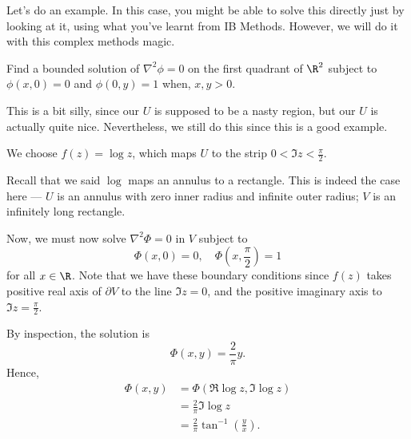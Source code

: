 \documentclass[a4paper]{article}
\begin{document}
Let's do an example. In this case, you might be able to solve this directly just by looking at it, using what you've learnt from IB Methods. However, we will do it with this complex methods magic.
\begin{eg}
  Find a bounded solution of $\nabla^2 \phi = 0$ on the first quadrant of $\R^2$ subject to $\phi(x, 0) = 0$ and $\phi(0, y) = 1$ when, $x, y > 0$.

  This is a bit silly, since our $U$ is supposed to be a nasty region, but our $U$ is actually quite nice. Nevertheless, we still do this since this is a good example.

  We choose $f(z) = \log z$, which maps $U$ to the strip $0 < \Im z < \frac{\pi}{2}$.
  \begin{center}
  \end{center}
  Recall that we said $\log$ maps an annulus to a rectangle. This is indeed the case here --- $U$ is an annulus with zero inner radius and infinite outer radius; $V$ is an infinitely long rectangle.

  Now, we must now solve $\nabla^2 \Phi = 0$ in $V$ subject to
  \[
    \Phi(x, 0) = 0,\quad \Phi\left(x, \frac{\pi}{2}\right) = 1
  \]
  for all $x \in \R$. Note that we have these boundary conditions since $f(z)$ takes positive real axis of $\partial V$ to the line $\Im z = 0$, and the positive imaginary axis to $\Im z = \frac{\pi}{2}$.

  By inspection, the solution is
  \[
    \Phi(x, y) = \frac{2}{\pi}y.
  \]
  Hence,
  \begin{align*}
    \Phi(x, y) &= \Phi(\Re \log z, \Im \log z)\\
    &= \frac{2}{\pi} \Im \log z\\
    &= \frac{2}{\pi} \tan^{-1}\left(\frac{y}{x}\right).
  \end{align*}
\end{eg}
\end{document}
